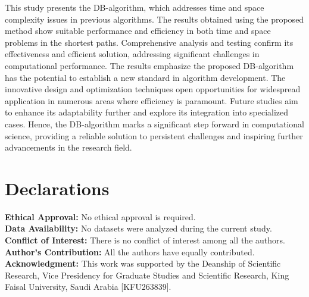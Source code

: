 \documentclass[10pt]{NSP1}
\begin{document}
	This study presents the DB-algorithm, which addresses time and space complexity issues in previous algorithms. The results obtained using the proposed method show suitable performance and efficiency in both time and space problems in the shortest paths. Comprehensive analysis and testing confirm its effectiveness and efficient solution, addressing significant challenges in computational performance. The results emphasize the proposed DB-algorithm has the potential to establish a new standard in algorithm development. The innovative design and optimization techniques open opportunities for widespread application in numerous areas where efficiency is paramount. Future studies aim to enhance its adaptability further and explore its integration into specialized cases. Hence, the DB-algorithm marks a significant step forward in computational science, providing a reliable solution to persistent challenges and inspiring further advancements in the research field.
	
	\section{Declarations}
	
	\noindent \textbf{Ethical Approval:} No ethical approval is required. \\[5pt]
	\textbf{Data Availability:} No datasets were analyzed during the current study. \\[5pt]
	\textbf{Conflict of Interest:} There is no conflict of interest among all the authors. \\[5pt]
	\textbf{Author's Contribution:} All the authors have equally contributed. \\[5pt]
	\textbf{Acknowledgment:} This work was supported by the Deanship of Scientific Research, Vice Presidency for Graduate Studies and Scientific Research, King Faisal University, Saudi Arabia [KFU263839].
	
\end{document}
